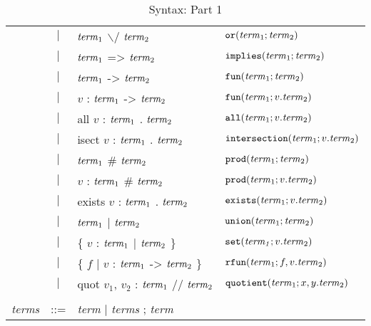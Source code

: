 \documentclass{article}
\begin{document}
\begin{table}[ht]
\begin{center}
{\begin{tabular}{|rcll|}
           & $|$ & ${\it term}_1$ $\backslash/$ ${\it term}_2$ &
              ${\tt or}({\it term}_1; {\it term}_2)$\\
           & $|$ & ${\it term}_1$ => ${\it term}_2$ &
              ${\tt implies}({\it term}_1; {\it term}_2)$\\
           & $|$ & ${\it term}_1$ -> ${\it term}_2$ &
              ${\tt fun}({\it term}_1; {\it term}_2)$\\
           & $|$ & $v$ \hbox{:} ${\it term}_1$ -> ${\it term}_2$ &
              ${\tt fun}({\it term}_1; v. {\it term}_2)$\\
           & $|$ & all $v$ \hbox{:} ${\it term}_1$ . ${\it term}_2$ &
              ${\tt all}({\it term}_1; v. {\it term}_2)$\\
           & $|$ & isect $v$ \hbox{:} ${\it term}_1$ . ${\it term}_2$ &
              ${\tt intersection}({\it term}_1; v. {\it term}_2)$\\
           & $|$ & ${\it term}_1$ \# ${\it term}_2$ &
              ${\tt prod}({\it term}_1; {\it term}_2)$\\
           & $|$ & $v$ \hbox{:} ${\it term}_1$ \# ${\it term}_2$ &
              ${\tt prod}({\it term}_1; v. {\it term}_2)$\\
           & $|$ & exists $v$ \hbox{:} ${\it term}_1$ . ${\it term}_2$ &
              ${\tt exists}({\it term}_1; v. {\it term}_2)$\\
           & $|$ & ${\it term}_1$ | ${\it term}_2$ &
              ${\tt union}({\it term}_1; {\it term}_2)$\\
           & $|$ & $\{$ $v$ \hbox{:} ${\it term}_1$ $|$ ${\it term}_2$ $\}$ &
              ${\tt set}({\it term_1}; v. {\it term}_2)$\\
           & $|$ & $\{$ $f$ $|$ $v$ \hbox{:} ${\it term}_1$ -> ${\it term}_2$ $\}$ &
              ${\tt rfun}({\it term}_1; f, v. {\it term}_2)$\\
           & $|$ & quot $v_1$, $v_2$ \hbox{:} ${\it term}_1$ // ${\it term}_2$ &
              ${\tt quotient}({\it term}_1; x, y. {\it term}_2)$\\
           &&&\\
      {\it terms} & {\rm ::=} & \multicolumn{2}{l|}{{\it term} $|$ {\it terms} ; {\it term}}\\
      \hline
    \end{tabular}}
\end{center}
\caption{\label{table:syntax1}Syntax: Part 1}
\end{table}
\end{document}
